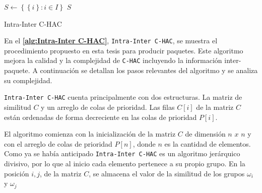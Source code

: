 \begin{center}
	\begin{algorithm}[H]
	\DontPrintSemicolon
	\SetAlgoLined
		$S \leftarrow \left\{\left\{i\right\}: i \in I\right\}$\;
		\Return $S$\;
	\caption{Intra-Inter C-HAC}\label{alg:Intra-Inter C-HAC}
	\end{algorithm}
\end{center}

En el \textbf{\autoref{alg:Intra-Inter C-HAC}}, \texttt{Intra-Inter C-HAC}, se muestra el procedimiento propuesto en esta tesis para producir paquetes. Este algoritmo mejora la calidad y la complejidad de \texttt{C-HAC} incluyendo la información inter-paquete. A continuación se detallan los pasos relevantes del algoritmo y se analiza su complejidad. 

\texttt{Intra-Inter C-HAC} cuenta principalmente con dos estructuras. La matriz de similitud $C$ y un arreglo de colas de prioridad. Las filas $C\left[i\right]$ de la matriz $C$ están ordenadas de forma decreciente en las colas de prioridad $P\left[i\right]$.

El algoritmo comienza con la inicialización de la matriz $C$ de dimensión $n$ $x$ $n$ y con el arreglo de colas de prioridad $P\left[n\right]$, donde $n$ es la cantidad de elementos. Como ya se había anticipado \texttt{Intra-Inter C-HAC} es un algoritmo jerárquico divisivo, por lo que al inicio cada elemento pertenece a su propio grupo. En la posición $i,j$, de la matriz $C$, se almacena el valor de la similitud de los grupos $\omega_{i}$ y $\omega_{j}$

